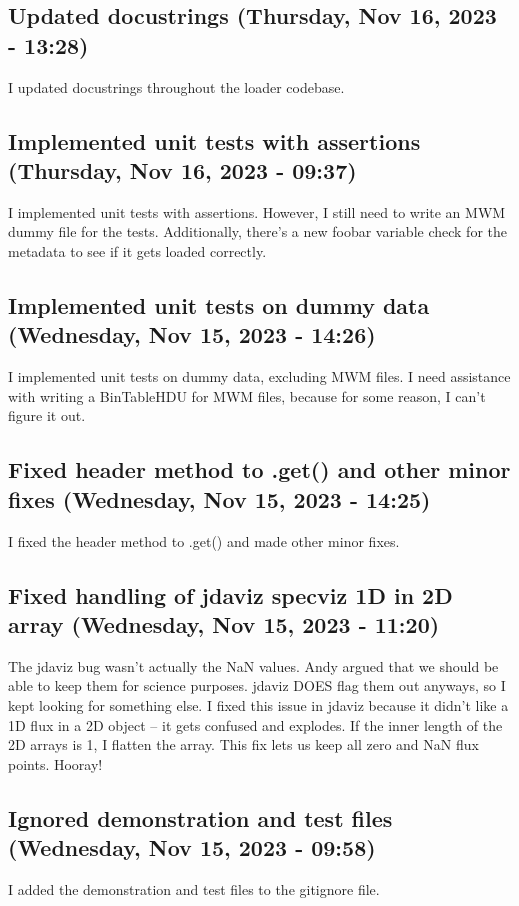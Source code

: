 \documentclass[a4paper]{article}
\begin{document}
\subsection*{Updated docustrings (Thursday, Nov 16, 2023 - 13:28)}
I updated docustrings throughout the loader codebase.

\subsection*{Implemented unit tests with assertions (Thursday, Nov 16, 2023 - 09:37)}
I implemented unit tests with assertions. However, I still need to write an MWM dummy file for the tests. Additionally, there's a new foobar variable check for the metadata to see if it gets loaded correctly.

\subsection*{Implemented unit tests on dummy data (Wednesday, Nov 15, 2023 - 14:26)}
I implemented unit tests on dummy data, excluding MWM files. I need assistance with writing a BinTableHDU for MWM files, because for some reason, I can't figure it out.

\subsection*{Fixed header method to .get() and other minor fixes (Wednesday, Nov 15, 2023 - 14:25)}
I fixed the header method to .get() and made other minor fixes.

\subsection*{Fixed handling of jdaviz specviz 1D in 2D array (Wednesday, Nov 15, 2023 - 11:20)}
The jdaviz bug wasn't actually the NaN values. Andy argued that we should be able to keep them for science purposes. jdaviz DOES flag them out anyways, so I kept looking for something else.
I fixed this issue in jdaviz because it didn't like a 1D flux in a 2D object -- it gets confused and explodes. If the inner length of the 2D arrays is 1, I flatten the array. This fix lets us keep all zero and NaN flux points. Hooray!

\subsection*{Ignored demonstration and test files (Wednesday, Nov 15, 2023 - 09:58)}
I added the demonstration and test files to the gitignore file.
\end{document}
